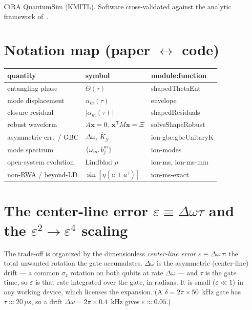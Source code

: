 \documentclass[aps,prapplied,twocolumn,superscriptaddress,floatfix,nofootinbib]{revtex4-2}
\begin{document}
\begin{acknowledgments}
CiRA QuantumSim (KMITL). Software cross-validated against the analytic framework
of~\cite{Zhang25}.
\end{acknowledgments}

\appendix

\section{Notation map (paper $\leftrightarrow$ code)}\label{app:notation}
{\scriptsize
\begin{ruledtabular}
\begin{tabular}{@{}p{}p{}p{}@{}}
quantity & symbol & module:function \\ \hline
entangling phase & $\Theta(\tau)$ & \textsf{shapedThetaEnt} \\
mode displacement & $\alpha_m(\tau)$ & \textsf{envelope} \\
closure residual & $|\alpha_m(\tau)|$ & \textsf{shapedResiduals} \\
robust waveform & $A\mathbf x{=}0$, $\mathbf x^{\mathsf T}\!M\mathbf x{=}\Xi$ & \textsf{solveShapeRobust} \\
asymmetric err.\ / GBC & $\Delta\omega$, $\hat K_{\mathcal G}$ & \textsf{ion-gbc:gbcUnitaryK} \\
mode spectrum & $\{\omega_m,b^m_j\}$ & \textsf{ion-modes} \\
open-system evolution & Lindblad $\dot\rho$ & \textsf{ion-ms}, \textsf{ion-ms-mm} \\
non-RWA / beyond-LD & $\sin[\eta(a{+}a^\dagger)]$ & \textsf{ion-ms-exact} \\
\end{tabular}
\end{ruledtabular}
}

\section{The center-line error $\varepsilon\equiv\Delta\omega\tau$ and the $\varepsilon^2\!\to\!\varepsilon^4$ scaling}\label{app:eps}
The trade-off is organized by the dimensionless \emph{center-line error}
$\varepsilon\equiv\Delta\omega\,\tau$: the total unwanted rotation the gate accumulates.
$\Delta\omega$ is the asymmetric (center-line) drift --- a common $\sigma_z$ rotation on both
qubits at rate $\Delta\omega$ --- and $\tau$ is the gate time, so $\varepsilon$ is that rate
integrated over the gate, in radians. It is small ($\varepsilon\ll1$) in any working device,
which licenses the expansion. (A $\delta=2\pi\times50$~kHz gate has $\tau\approx20~\mu$s, so a
drift $\Delta\omega=2\pi\times0.4$~kHz gives $\varepsilon\approx0.05$.)
\end{document}
